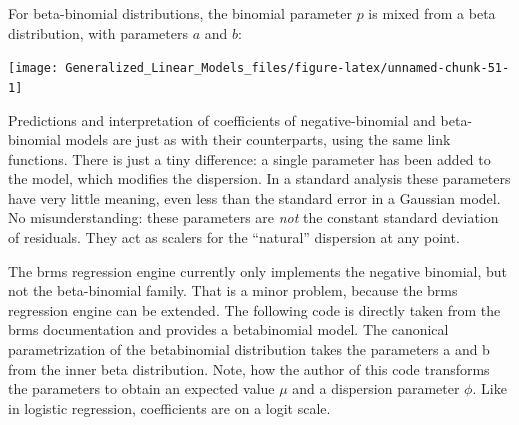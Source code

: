 \documentclass[]{svmono}
\newenvironment{Shaded}{\begin{snugshade}}{\end{snugshade}}
\newcommand{\KeywordTok}[1]{\textcolor[rgb]{0.13,0.29,0.53}{\textbf{#1}}}
\newcommand{\DecValTok}[1]{\textcolor[rgb]{0.00,0.00,0.81}{#1}}
\newcommand{\StringTok}[1]{\textcolor[rgb]{0.31,0.60,0.02}{#1}}
\newcommand{\ControlFlowTok}[1]{\textcolor[rgb]{0.13,0.29,0.53}{\textbf{#1}}}
\newcommand{\OperatorTok}[1]{\textcolor[rgb]{0.81,0.36,0.00}{\textbf{#1}}}
\newcommand{\NormalTok}[1]{#1}
\begin{document}
For beta-binomial distributions, the binomial parameter \(p\) is mixed
from a beta distribution, with parameters \(a\) and \(b\):

\begin{Shaded}
\end{Shaded}

\texttt{[image: Generalized\_Linear\_Models\_files/figure-latex/unnamed-chunk-51-1]}

Predictions and interpretation of coefficients of negative-binomial and
beta-binomial models are just as with their counterparts, using the same
link functions. There is just a tiny difference: a single parameter has
been added to the model, which modifies the dispersion. In a standard
analysis these parameters have very little meaning, even less than the
standard error in a Gaussian model. No misunderstanding: these
parameters are \emph{not} the constant standard deviation of residuals.
They act as scalers for the ``natural'' dispersion at any point.

The brms regression engine currently only implements the negative
binomial, but not the beta-binomial family. That is a minor problem,
because the brms regression engine can be extended. The following code
is directly taken from the brms documentation and provides a
betabinomial model. The canonical parametrization of the betabinomial
distribution takes the parameters a and b from the inner beta
distribution. Note, how the author of this code transforms the
parameters to obtain an expected value \(\mu\) and a dispersion
parameter \(\phi\). Like in logistic regression, coefficients are on a
logit scale.
\end{document}
